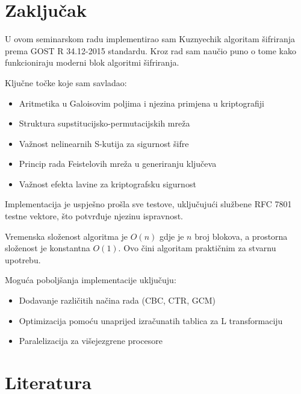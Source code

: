 \documentclass[12pt,a4paper]{article}
\begin{document}
\newpage
\section{Zaključak}

U ovom seminarskom radu implementirao sam Kuznyechik algoritam šifriranja prema GOST R 34.12-2015 standardu. Kroz rad sam naučio puno o tome kako funkcioniraju moderni blok algoritmi šifriranja.

Ključne točke koje sam savladao:
\begin{itemize}
    \item Aritmetika u Galoisovim poljima i njezina primjena u kriptografiji
    \item Struktura supstitucijsko-permutacijskih mreža
    \item Važnost nelinearnih S-kutija za sigurnost šifre
    \item Princip rada Feistelovih mreža u generiranju ključeva
    \item Važnost efekta lavine za kriptografsku sigurnost
\end{itemize}

Implementacija je uspješno prošla sve testove, uključujući službene RFC 7801 testne vektore, što potvrđuje njezinu ispravnost.

Vremenska složenost algoritma je $O(n)$ gdje je $n$ broj blokova, a prostorna složenost je konstantna $O(1)$. Ovo čini algoritam praktičnim za stvarnu upotrebu.

Moguća poboljšanja implementacije uključuju:
\begin{itemize}
    \item Dodavanje različitih načina rada (CBC, CTR, GCM)
    \item Optimizacija pomoću unaprijed izračunatih tablica za L transformaciju
    \item Paralelizacija za višejezgrene procesore
\end{itemize}

\newpage
\section*{Literatura}
\end{document}
